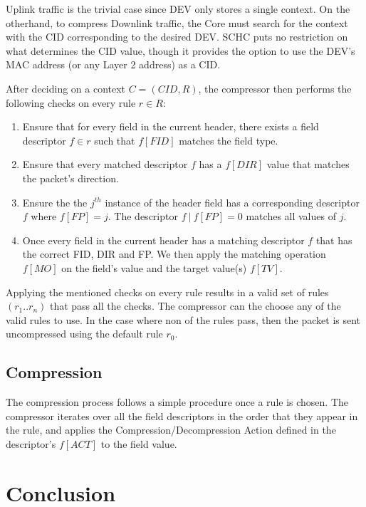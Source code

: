 \documentclass[12pt]{../dalthesis}
\begin{document}
	\vspace{1em}
	Uplink traffic is the trivial case since DEV only stores a single context. On the otherhand, to compress Downlink traffic, the Core must search
	for the context with the CID corresponding to the desired DEV. SCHC puts no restriction on what determines the CID value, though it provides 
	the option to use the DEV's MAC address (or any Layer 2 address) as a CID. 

	After deciding on a context $C = (CID, R)$, the compressor then performs the following checks on every rule $r\in R$:
	\begin{enumerate}
		\item Ensure that for every field in the current header, there exists a field descriptor $f \in r$ such that $f[FID]$ matches the field type.
		\item Ensure that every matched descriptor $f$ has a $f[DIR]$ value that matches the packet's direction.
		\item Ensure the the $j^{th}$ instance of the header field has a corresponding descriptor $f$ where $f[FP] = j$. The descriptor
			$f \ | \ f[FP]=0$ matches all values of $j$.
		\item Once every field in the current header has a matching descriptor $f$ that has the correct FID, DIR and FP. 
			We then apply the matching operation $f[MO]$ on the field's value and the target value(s) $f[TV]$.
	\end{enumerate} 

	Applying the mentioned checks on every rule results in a valid set of rules $(r_1..r_n)$ that pass all the checks.
	The compressor can the choose any of the valid rules to use. In the case where non
	of the rules pass, then the packet is sent uncompressed using the default rule $r_0$.

	\vspace{3em}
	\section{Compression}
	The compression process follows a simple procedure once a rule is chosen. The compressor iterates over 
	all the field descriptors in the order that they appear in the rule, and applies the Compression/Decompression Action
	defined in the descriptor's $f[ACT]$ to the field value. 
\chapter{Conclusion}




\end{document}
